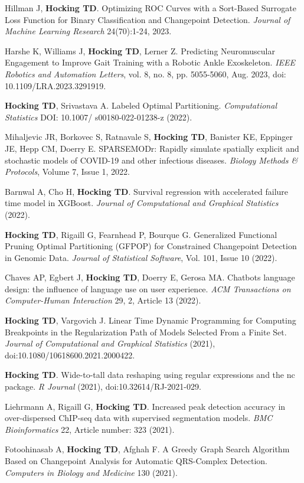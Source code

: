 \documentclass[margin,line]{res}
\begin{document}
\begin{resume}
Hillman J, {\bf Hocking TD}. Optimizing ROC Curves with a Sort-Based
Surrogate Loss Function for Binary Classification and Changepoint
Detection. {\it Journal of Machine Learning Research} 24(70):1-24, 2023.

Harshe K, Williams J, {\bf Hocking TD}, Lerner Z. Predicting Neuromuscular
Engagement to Improve Gait Training with a Robotic Ankle
Exoskeleton. {\it IEEE Robotics and Automation Letters}, vol. 8,
no. 8, pp. 5055-5060, Aug. 2023, doi: 10.1109/LRA.2023.3291919.

{\bf Hocking TD}, Srivastava A. Labeled Optimal Partitioning. {\it
  Computational Statistics} DOI: 10.1007/ s00180-022-01238-z (2022).

Mihaljevic JR, Borkovec S, Ratnavale S, \textbf{Hocking TD}, Banister
KE, Eppinger JE, Hepp CM, Doerry E. SPARSEMODr: Rapidly simulate
spatially explicit and stochastic models of COVID-19 and other
infectious diseases. {\it Biology Methods \& Protocols}, Volume 7,
Issue 1, 2022.

Barnwal A, Cho H, {\bf Hocking TD}. Survival regression with
accelerated failure time model in XGBoost. {\it Journal of
  Computational and Graphical Statistics} (2022).

{\bf Hocking TD}, Rigaill G, Fearnhead P, Bourque G. Generalized
Functional Pruning Optimal Partitioning (GFPOP) for Constrained
Changepoint Detection in Genomic Data. {\it Journal of Statistical
  Software}, Vol. 101, Issue 10 (2022).

Chaves AP, Egbert J, {\bf Hocking TD}, Doerry E, Gerosa MA. Chatbots
language design: the influence of language use on user
experience. {\it ACM Transactions on Computer-Human Interaction} 29,
2, Article 13 (2022).

{\bf Hocking TD}, Vargovich J. Linear Time Dynamic Programming for
Computing Breakpoints in the Regularization Path of Models Selected
From a Finite Set. {\it Journal of Computational and Graphical
  Statistics} (2021), doi:10.1080/10618600.2021.2000422.

{\bf Hocking TD}. Wide-to-tall data reshaping using regular
expressions and the nc package. {\it R Journal} (2021),
doi:10.32614/RJ-2021-029.

Liehrmann A, Rigaill G, {\bf Hocking TD}. Increased peak detection
accuracy in over-dispersed ChIP-seq data with supervised segmentation
models. {\it BMC Bioinformatics} 22, Article number: 323 (2021).

Fotoohinasab A, {\bf Hocking TD}, Afghah F. A Greedy Graph Search
Algorithm Based on Changepoint Analysis for Automatic QRS-Complex
Detection. {\it Computers in Biology and Medicine} 130 (2021).


\end{resume}
\end{document}
